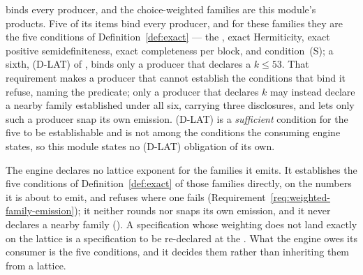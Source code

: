 
 binds every producer, and the
choice-weighted families are this module's products. Five of its items bind
every producer, and for these families they are the five conditions of
Definition~\ref{def:exact} --- the , exact Hermiticity, exact
positive semidefiniteness, exact completeness per block, and condition~(S);
a sixth, (D-LAT) of , binds only a
producer that declares a  $k\le53$. That requirement
makes a producer that cannot establish the conditions that bind it refuse,
naming the predicate; only a producer that declares $k$ may instead declare a
nearby family established under all six, carrying three disclosures, and
 lets only such a producer snap its own
emission. (D-LAT) is a \emph{sufficient} condition for the five to be
establishable and is not among the conditions the consuming engine states,
so this module states no (D-LAT) obligation of its own.

\begin{requirement}\label{req:no-lattice-exponent}
The engine declares no lattice exponent for the families it emits. It
establishes the five conditions of Definition~\ref{def:exact} of those
families directly, on the numbers it is about to emit, and refuses where one
fails (Requirement~\ref{req:weighted-family-emission}); it neither rounds nor
snaps its own emission, and it never declares a nearby family
(). A specification whose weighting does not land exactly
on the lattice is a specification to be re-declared at the .
What the engine owes its consumer is the five conditions, and it decides them
rather than inheriting them from a lattice.
\end{requirement}
